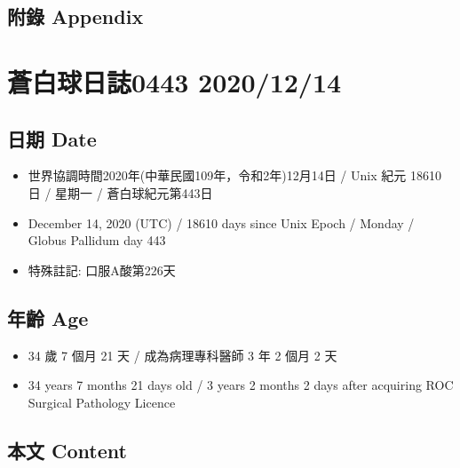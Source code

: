 \documentclass[a5paper, 10pt
]{book}
\providecommand{\tightlist}{%
  \setlength{\itemsep}{0pt}\setlength{\parskip}{0pt}}
\begin{document}
\hypertarget{ux9644ux9304-appendix-12}{%
\subsection{附錄 Appendix}\label{ux9644ux9304-appendix-12}}

\hypertarget{ux84bcux767dux7403ux65e5ux8a8c0443-20201214}{%
\section{蒼白球日誌0443
2020/12/14}\label{ux84bcux767dux7403ux65e5ux8a8c0443-20201214}}

\hypertarget{ux65e5ux671f-date-13}{%
\subsection{日期 Date}\label{ux65e5ux671f-date-13}}

\begin{itemize}
\tightlist
\item
  世界協調時間2020年(中華民國109年，令和2年)12月14日 / Unix 紀元 18610
  日 / 星期一 / 蒼白球紀元第443日
\item
  December 14, 2020 (UTC) / 18610 days since Unix Epoch / Monday /
  Globus Pallidum day 443
\item
  特殊註記: 口服A酸第226天
\end{itemize}

\hypertarget{ux5e74ux9f61-age-13}{%
\subsection{年齡 Age}\label{ux5e74ux9f61-age-13}}

\begin{itemize}
\tightlist
\item
  34 歲 7 個月 21 天 / 成為病理專科醫師 3 年 2 個月 2 天
\item
  34 years 7 months 21 days old / 3 years 2 months 2 days after
  acquiring ROC Surgical Pathology Licence
\end{itemize}

\hypertarget{ux672cux6587-content-13}{%
\subsection{本文 Content}\label{ux672cux6587-content-13}}
\end{document}
